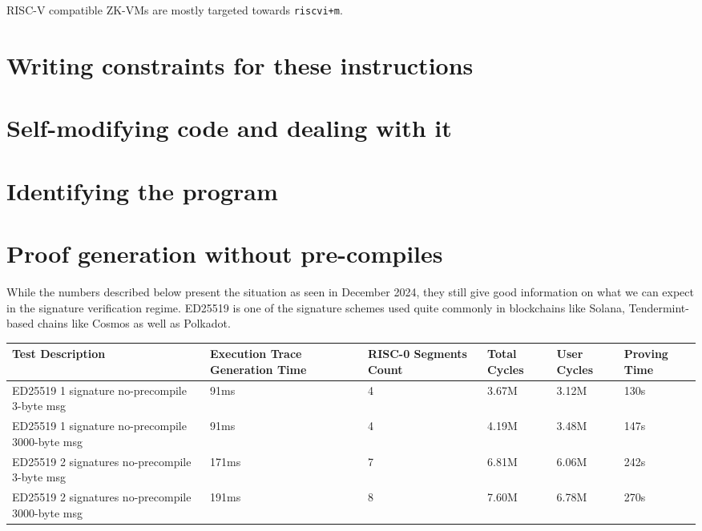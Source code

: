RISC-V compatible ZK-VMs are mostly targeted towards \texttt{riscvi+m}.

\section{Writing constraints for these instructions}

\section{Self-modifying code and dealing with it}

\section{Identifying the program}

\section{Proof generation without pre-compiles}
While the numbers described below present the situation as seen in December 2024, they still give good information on what we can expect in the signature verification regime. ED25519 is one of the signature schemes used quite commonly in blockchains like Solana, Tendermint-based chains like Cosmos as well as Polkadot.

\begin{center}
\begin{tabular}{ | m{14em} | m{5em}| m{5em} |m{5em} |m{5em} |m{4em} | } 
  \hline
  \textbf{Test Description} & \textbf{Execution Trace Generation Time} & \textbf{RISC-0 Segments Count} & \textbf{Total Cycles} & \textbf{User Cycles} & \textbf{Proving Time}\\ 
  \hline
  ED25519 1 signature no-precompile 3-byte msg  & 91ms & 4 & 3.67M & 3.12M & 130s \\ 
  \hline
  ED25519 1 signature no-precompile 3000-byte msg  & 91ms & 4 & 4.19M & 3.48M & 147s \\ 
  \hline
  ED25519 2 signatures no-precompile 3-byte msg  & 171ms & 7 & 6.81M & 6.06M & 242s \\ 
  \hline
  ED25519 2 signatures no-precompile 3000-byte msg  & 191ms & 8 & 7.60M & 6.78M & 270s \\ 
  \hline
\end{tabular}
\end{center}

